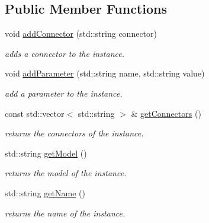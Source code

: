 \subsection*{Public Member Functions}
\begin{DoxyCompactItemize}
\item 
void \mbox{\hyperlink{class_s_p_i_c_e_1_1_instance_af9aeca34e780851a2b024df7c5ff5b54}{add\+Connector}} (std\+::string connector)
\begin{DoxyCompactList}\small\item\em adds a connector to the instance. \end{DoxyCompactList}\item 
void \mbox{\hyperlink{class_s_p_i_c_e_1_1_instance_a8d69bbbea5ece0949e100c464e412f20}{add\+Parameter}} (std\+::string name, std\+::string value)
\begin{DoxyCompactList}\small\item\em add a parameter to the instance. \end{DoxyCompactList}\item 
\mbox{\label{class_s_p_i_c_e_1_1_instance_acce8940edeaa3d79c522006f987e0711}} 
const std\+::vector$<$ std\+::string $>$ \& \mbox{\hyperlink{class_s_p_i_c_e_1_1_instance_acce8940edeaa3d79c522006f987e0711}{get\+Connectors}} ()
\begin{DoxyCompactList}\small\item\em returns the connectors of the instance. \end{DoxyCompactList}\item 
\mbox{\label{class_s_p_i_c_e_1_1_instance_afc74cbe93df9c473a53db83a325f8f9d}} 
std\+::string \mbox{\hyperlink{class_s_p_i_c_e_1_1_instance_afc74cbe93df9c473a53db83a325f8f9d}{get\+Model}} ()
\begin{DoxyCompactList}\small\item\em returns the model of the instance. \end{DoxyCompactList}\item 
\mbox{\label{class_s_p_i_c_e_1_1_instance_ac0fc966d4386ddb71d99361e3fccb311}} 
std\+::string \mbox{\hyperlink{class_s_p_i_c_e_1_1_instance_ac0fc966d4386ddb71d99361e3fccb311}{get\+Name}} ()
\begin{DoxyCompactList}\small\item\em returns the name of the instance. \end{DoxyCompactList}\item 

\end{DoxyCompactItemize}
